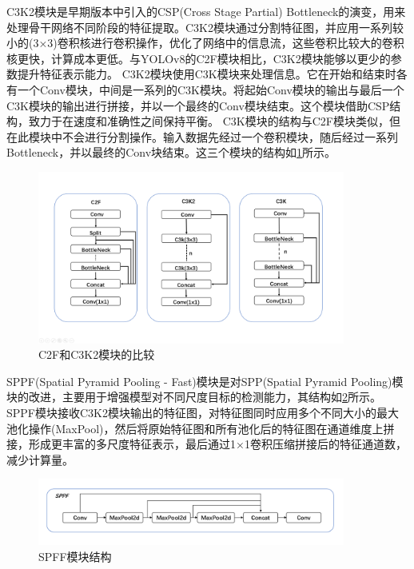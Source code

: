 C3K2模块是早期版本中引入的CSP(Cross Stage Partial) Bottleneck的演变，用来处理骨干网络不同阶段的特征提取。C3K2模块通过分割特征图，并应用一系列较小的(3×3)卷积核进行卷积操作，优化了网络中的信息流，这些卷积比较大的卷积核更快，计算成本更低。与YOLOv8的C2F模块相比，C3K2模块能够以更少的参数提升特征表示能力。
C3K2模块使用C3K模块来处理信息。它在开始和结束时各有一个Conv模块，中间是一系列的C3K模块。将起始Conv模块的输出与最后一个C3K模块的输出进行拼接，并以一个最终的Conv模块结束。这个模块借助CSP结构，致力于在速度和准确性之间保持平衡。
C3K模块的结构与C2F模块类似，但在此模块中不会进行分割操作。输入数据先经过一个卷积模块，随后经过一系列Bottleneck，并以最终的Conv块结束。这三个模块的结构如\ref{fig:c3k}所示。

\begin{figure}[!htb]
  \centering
  \includegraphics[width=0.9\textwidth]{figs/chap02/c2f.png}
  \caption{C2F和C3K2模块的比较}
  \label{fig:c3k}
\end{figure}

SPPF(Spatial Pyramid Pooling - Fast)模块是对SPP(Spatial Pyramid Pooling)模块的改进，主要用于增强模型对不同尺度目标的检测能力，其结构如\ref{fig:sppf}所示。SPPF模块接收C3K2模块输出的特征图，对特征图同时应用多个不同大小的最大池化操作(MaxPool)，然后将原始特征图和所有池化后的特征图在通道维度上拼接，形成更丰富的多尺度特征表示，最后通过1×1卷积压缩拼接后的特征通道数，减少计算量。

\begin{figure}[!htb]
  \centering
  \includegraphics[width=0.9\textwidth]{figs/chap02/sppf.png}
  \caption{SPFF模块结构}
  \label{fig:sppf}
\end{figure}

